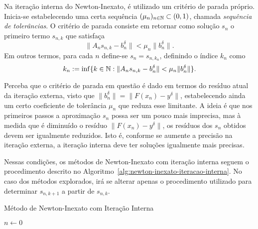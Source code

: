 Na iteração interna do Newton-Inexato, é utilizado um critério de parada próprio. Inicia-se estabelecendo uma certa sequência $(\mu_n)_{n \in \mathbb N} \subset (0,1)$, chamada \textit{sequência de tolerâncias}. O critério de parada consiste em retornar como solução $s_n$ o primeiro termo $s_{n,k}$ que satisfaça
\begin{equation}
    \| A_n s_{n,k} -b_n^\delta\| < \mu_n \|b_n^\delta\|.
\end{equation}
Em outros termos, para cada $n$ define-se $s_n=s_{n,k_n}$, definindo o índice $k_n$ como
\begin{equation}
    k_n := \inf\{k \in \mathbb N : \| A_n s_{n,k} -b_n^\delta\| < \mu_n \|b_n^\delta\|\}.
\end{equation}

Perceba que o critério de parada em questão é dado em termos do resíduo atual da iteração externa, visto que $\|b_n^\delta\| = \|F(x_n) - y^\delta\|$, estabelecendo ainda um certo coeficiente de tolerância $\mu_n$ que reduza esse limitante. A ideia é que nos primeiros passos a aproximação $s_n$ possa ser um pouco mais imprecisa, mas à medida que é diminuído o resíduo $\| F(x_n) - y^\delta\|$, os resíduos dos $s_n$ obtidos devem ser igualmente reduzidos. Isto é, conforme se aumente a precisão na iteração externa, a iteração interna deve ter soluções igualmente mais precisas. 

Nessas condições, os métodos de Newton-Inexato com iteração interna seguem o procedimento descrito no Algoritmo~\ref{alg:newton-inexato-iteracao-interna}. No caso dos métodos explorados, irá se alterar apenas o procedimento utilizado para determinar $s_{n,k+1}$ a partir de $s_{n,k}$. 

\begin{algorithm}[H] \label{alg:newton-inexato-iteracao-interna}
    \LinesNumbered
    \caption{Método de Newton-Inexato com Iteração Interna}
    $n \gets 0$ \\
\end{algorithm}

